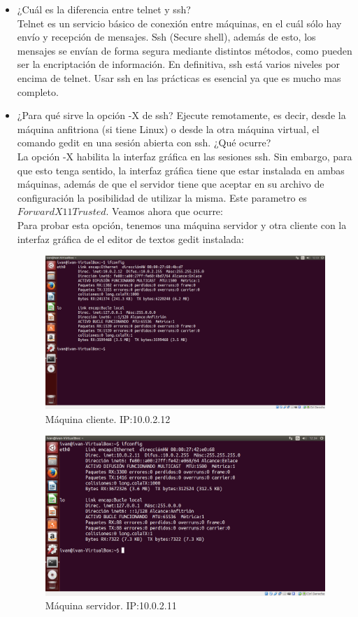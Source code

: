  
 \begin{itemize}
 	\item ¿Cuál es la diferencia entre telnet y ssh?\\
 	Telnet\cite{telnet} es un servicio básico de conexión entre máquinas, en el cuál sólo hay envío y recepción de mensajes. Ssh\cite{ssh} (Secure shell), además de esto, los mensajes se envían de forma segura mediante distintos métodos, como pueden ser la encriptación de información. En definitiva, ssh está varios niveles por encima de telnet. Usar ssh en las prácticas es esencial ya que es mucho mas completo.
 	
 	\item ¿Para qué sirve la opción -X de ssh? Ejecute remotamente, es decir, desde la máquina anfitriona (si tiene Linux) o desde la otra máquina virtual, el comando gedit en una sesión abierta con ssh. ¿Qué ocurre?\\
 	
 	La opción -X habilita la interfaz gráfica en las sesiones ssh\cite{ssh-client}. Sin embargo, para que esto tenga sentido, la interfaz gráfica tiene que estar instalada en ambas máquinas, además de que el servidor tiene que aceptar en su archivo de configuración\cite{sshd_config} la posibilidad de utilizar la misma. Este parametro es $ForwardX11Trusted$. Veamos ahora que ocurre:\\
 	
 	Para probar esta opción, tenemos una máquina servidor y otra cliente con la interfaz gráfica de el editor de textos gedit instalada:
 	
 	\begin{figure}[H]
		\centering
		\includegraphics[width=0.7\linewidth]{clientessh-X}
		\caption[Cliente]{Máquina cliente. IP:10.0.2.12}
		\label{fig:clientessh-X}
	\end{figure}
	
	\begin{figure}[H]
		\centering
		\includegraphics[width=0.7\linewidth]{servidorssh-X}
		\caption[Servidor]{Máquina servidor. IP:10.0.2.11}
		\label{fig:servidorssh-X}
	\end{figure}
	

\end{itemize}

